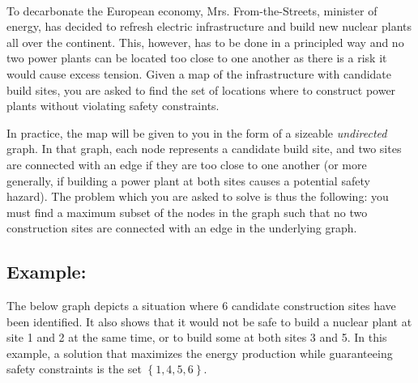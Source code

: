 \documentclass[12pt]{report}
\begin{document}
\newpage
\begin{Exercise}[title={Building Nuclear Plants}]
\\
To decarbonate the European economy, Mrs. From-the-Streets, minister of energy, 
has decided to refresh electric infrastructure and build new nuclear plants all over the
continent. This, however, has to be done in a principled way and no two power plants can
be located too close to one another as there is a risk it would cause excess tension.
Given a map of the infrastructure with candidate build sites, you are asked to find 
the set of locations where to construct power plants without violating safety constraints.

In practice, the map will be given to you in the form of a sizeable \emph{undirected} graph. 
In that graph, each node represents a candidate build site, and two sites are connected
with an edge if they are too close to one another (or more generally, if building a power
plant at both sites causes a potential safety hazard). The problem which you are asked to 
solve is thus the following: you must find a maximum subset of the nodes in the graph
such that no two construction sites are connected with an edge in the underlying graph.

\subsection*{Example:}
The below graph depicts a situation where 6 candidate construction sites have been identified.
It also shows that it would not be safe to build a nuclear plant at site 1 and 2 at the same
time, or to build some at both sites 3 and 5. In this example, a solution that maximizes the
energy production while guaranteeing safety constraints is the set $\left\{ 1, 4, 5, 6 \right\}$.

\begin{center}
\end{center}
\end{Exercise}
\end{document}
